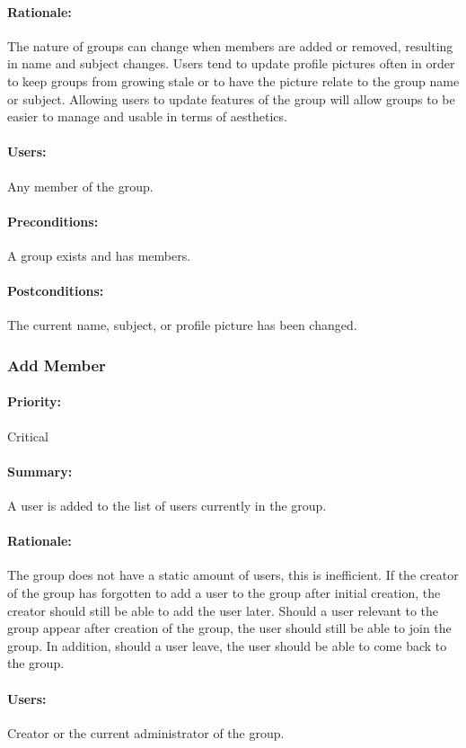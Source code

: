 \documentclass[11pt]{article}
\begin{document}
\paragraph{Rationale:}
The nature of groups can change when members are added or removed, resulting in name and subject changes. Users tend to update profile pictures often in order to keep groups from growing stale or to have the picture relate to the group name or subject. Allowing users to update features of the group will allow groups to be easier to manage and usable in terms of aesthetics.
\paragraph{Users:}
Any member of the group.
\paragraph{Preconditions:}
A group exists and has members.
\paragraph{{Postconditions:}}
The current name, subject, or profile picture has been changed.

\subsubsection{Add Member} \label{UC-add-member}
\paragraph{Priority:} Critical
\paragraph{Summary:}
A user is added to the list of users currently in the group.
\paragraph{Rationale:}
The group does not have a static amount of users, this is inefficient. If the creator of the group has forgotten to add a user to the group after initial creation, the creator should still be able to add the user later. Should a user relevant to the group appear after creation of the group, the user should still be able to join the group. In addition, should a user leave, the user should be able to come back to the group.
\paragraph{Users:}
Creator or the current administrator of the group.
\end{document}
